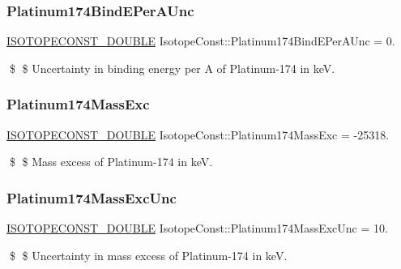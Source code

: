 \subsubsection{\texorpdfstring{Platinum174\+Bind\+E\+Per\+A\+Unc}{Platinum174BindEPerAUnc}}
{\footnotesize\ttfamily \mbox{\hyperlink{group___isotope_const-_macros_ga8f45a7272ce02c0b4c65c44636ed719a}{I\+S\+O\+T\+O\+P\+E\+C\+O\+N\+S\+T\+\_\+\+D\+O\+U\+B\+LE}} Isotope\+Const\+::\+Platinum174\+Bind\+E\+Per\+A\+Unc = 0.}

\$ \$ Uncertainty in binding energy per A of Platinum-\/174 in keV. \mbox{\label{group___isotope_const-_platinum-_pt174_ga6baebf6bf135a24c399e4cbd1ec31391}} 
\subsubsection{\texorpdfstring{Platinum174\+Mass\+Exc}{Platinum174MassExc}}
{\footnotesize\ttfamily \mbox{\hyperlink{group___isotope_const-_macros_ga8f45a7272ce02c0b4c65c44636ed719a}{I\+S\+O\+T\+O\+P\+E\+C\+O\+N\+S\+T\+\_\+\+D\+O\+U\+B\+LE}} Isotope\+Const\+::\+Platinum174\+Mass\+Exc = -\/25318.}

\$ \$ Mass excess of Platinum-\/174 in keV. \mbox{\label{group___isotope_const-_platinum-_pt174_ga18cf0af536da8a714366b30a30e7a4d6}} 
\subsubsection{\texorpdfstring{Platinum174\+Mass\+Exc\+Unc}{Platinum174MassExcUnc}}
{\footnotesize\ttfamily \mbox{\hyperlink{group___isotope_const-_macros_ga8f45a7272ce02c0b4c65c44636ed719a}{I\+S\+O\+T\+O\+P\+E\+C\+O\+N\+S\+T\+\_\+\+D\+O\+U\+B\+LE}} Isotope\+Const\+::\+Platinum174\+Mass\+Exc\+Unc = 10.}

\$ \$ Uncertainty in mass excess of Platinum-\/174 in keV. \mbox{\label{group___isotope_const-_platinum-_pt174_ga6ee1eb9509ff26ba51592937050163eb}} 
